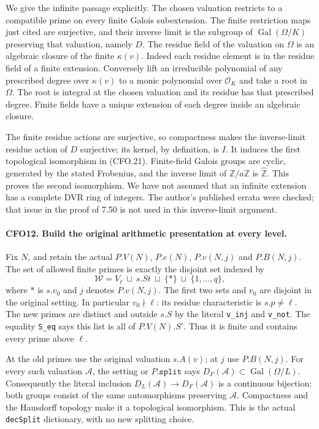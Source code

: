 We give the infinite passage explicitly.  The chosen valuation
restricts to a compatible prime on every finite Galois
subextension.  The finite restriction maps just cited are
surjective, and their inverse limit is the subgroup of
$\operatorname{Gal}(\Omega/K)$ preserving that valuation,
namely $D$.  The residue field of the valuation on $\Omega$
is an algebraic closure of the finite $\kappa(v)$.
Indeed each residue element is in the residue field of a
finite extension.  Conversely lift an irreducible polynomial
of any prescribed degree over $\kappa(v)$ to a monic
polynomial over $\mathcal O_K$ and take a root in $\Omega$.
The root is integral at the chosen valuation and its residue
has that prescribed degree.  Finite fields have a unique
extension of each degree inside an algebraic closure.

The finite residue actions are surjective, so compactness
makes the inverse-limit residue action of $D$ surjective;
its kernel, by definition, is $I$.  It induces the first
topological isomorphism in (CFO.21).  Finite-field Galois
groups are cyclic, generated by the stated Frobenius, and
the inverse limit of $\mathbb Z/a\mathbb Z$ is
$\widehat{\mathbb Z}$.  This proves the second isomorphism.
We have not assumed that an infinite extension has a
complete DVR ring of integers.  The author's published
errata were checked; that issue in the proof of 7.50 is not
used in this inverse-limit argument.

\paragraph{CFO12. Build the original arithmetic presentation at every level.}
\label{claim:CFO12}
Fix $N$, and retain the actual $P.V(N)$, $P.e(N)$, $P.v(N,j)$
and $P.B(N,j)$.  The set of allowed finite primes is exactly
the disjoint set indexed by
\[
 \mathcal W=V_\ell\ \sqcup\ s.St\ \sqcup\
                    \{\ast\}\ \sqcup\ \{1,\ldots,q\},             \tag{CFO.22}
\]
where $\ast$ is $s.v_0$ and $j$ denotes $P.v(N,j)$.
The first two sets and $v_0$ are disjoint in the original
setting.  In particular $v_0\nmid\ell$: its residue
characteristic is $s.p\ne\ell$.  The new primes are distinct
and outside $s.S$ by the literal \texttt{v\_inj} and
\texttt{v\_not}.  The equality \texttt{S\_eq} says this list
is all of $P.V(N).S'$.  Thus it is finite and contains every
prime above $\ell$.

At the old primes use the original valuation $s.A(v)$;
at $j$ use $P.B(N,j)$.  For every such valuation $\mathcal A$,
the setting or $P.\texttt{split}$ says
$D_F(\mathcal A)\subset\operatorname{Gal}(\Omega/L)$.
Consequently the literal inclusion
$D_L(\mathcal A)\to D_F(\mathcal A)$ is a continuous
bijection: both groups consist of the same automorphisms
preserving $\mathcal A$.  Compactness and the Hausdorff
topology make it a topological isomorphism.  This is the
actual \texttt{decSplit} dictionary, with no new splitting
choice.

